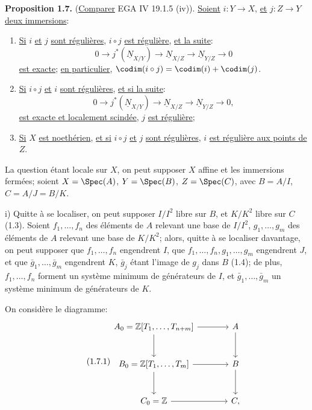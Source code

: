 
\textbf{Proposition 1.7.} (\uline{Comparer} EGA IV 19.1.5 (iv)). \uline{Soient} $i:Y\longrightarrow X$, \uline{et} $j:Z\longrightarrow Y$ \uline{deux immersions}:
\begin{enumerate}[label=\roman*)]
\item \uline{Si} $i$ \uline{et} $j$ \uline{sont régulières}, $i\circ j$ \uline{est régulière}, \uline{et la suite}:
\[
0\longrightarrow j^*(\underline{N}_{X/Y})\longrightarrow \underline{N}_{X/Z}\longrightarrow \underline{N}_{Y/Z}\longrightarrow0
\]
\uline{est exacte}; \uline{en particulier}, $\codim(i\circ j)=\codim(i)+\codim(j)$.
\item \uline{Si} $i\circ j$ \uline{et} $i$ \uline{sont régulières}, \uline{et si la suite}:
\[
0\longrightarrow j^*(\underline{N}_{X/Y})\longrightarrow \underline{N}_{X/Z}\longrightarrow \underline{N}_{Y/Z}\longrightarrow0,
\]
\uline{est exacte et localement scindée}, $j$ \uline{est régulière};
\item \uline{Si} $X$ \uline{est noethérien}, \uline{et si} $i\circ j$ \uline{et} $j$ \uline{sont régulières}, $i$ \uline{est régulière aux points de} $Z$.
\end{enumerate}

La question étant locale sur $X$, on peut supposer $X$ affine et les immersions fermées; soient $X=\Spec(A)$, $Y=\Spec(B)$, $Z=\Spec(C)$, avec $B=A/I$, $C=A/J=B/K$.

i) Quitte à se localiser, on peut supposer $I/I^2$ libre sur $B$, et $K/K^2$ libre sur $C$ (1.3). Soient $f_1,\ldots,f_n$ des éléments de $A$ relevant une base de $I/I^2$, $g_1,\ldots,g_m$ des éléments de $A$ relevant une base de $K/K^2$; alors, quitte à se localiser davantage, on peut supposer que $f_1,\ldots,f_n$ engendrent $I$, que $f_1,\ldots,f_n,g_1,\ldots,g_m$ engendrent $J$, et que $\bar g_1,\ldots,\bar g_m$ engendrent $K$, $\bar g_j$ étant l'image de $g_j$ dans $B$ (1.4); de plus, $f_1,\ldots,f_n$ forment un système minimum de générateurs de $I$, et $\bar g_1,\ldots,\bar g_m$ un système minimum de générateurs de $K$.

On considère le diagramme:
\begin{equation}\tag{1.7.1}
\begin{tikzcd}[column sep=large,row sep=large]
A_0=\mathbb Z[T_1,\ldots,T_{n+m}] \arrow[r] \arrow[d] & A \arrow[d]\\
B_0=\mathbb Z[T_1,\ldots,T_m] \arrow[r] \arrow[d] & B \arrow[d]\\
C_0=\mathbb Z \arrow[r] & C,
\end{tikzcd}
\end{equation}
